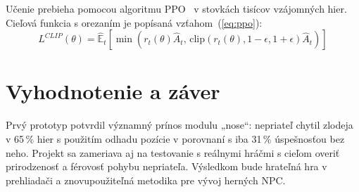 \documentclass[10pt,twoside,slovak,a4paper,twocolumn]{article}
\begin{document}
Učenie prebieha pomocou algoritmu PPO~\cite{Schulman2017PPO} v stovkách tisícov vzájomných hier. Cieľová funkcia s orezaním je popísaná vzťahom~(\ref{eq:ppo}):
\begin{equation} \label{eq:ppo}
L^{CLIP}(\theta) = \hat{\mathbb{E}}_t \left[ \min \left( r_t(\theta) \hat{A}_t, \, \text{clip}(r_t(\theta), 1-\epsilon, 1+\epsilon) \hat{A}_t \right) \right]
\end{equation}

\section{Vyhodnotenie a záver} \label{zaver}
Prvý prototyp potvrdil významný prínos modulu „nose“: nepriateľ chytil zlodeja v 65\,\% hier s použitím odhadu pozície v porovnaní s iba 31\,\% úspešnosťou bez neho. Projekt sa zameriava aj na testovanie s reálnymi hráčmi s cieľom overiť prirodzenosť a férovosť pohybu nepriateľa. Výsledkom bude hrateľná hra v prehliadači a znovupoužiteľná metodika pre vývoj herných NPC.



\end{document}
